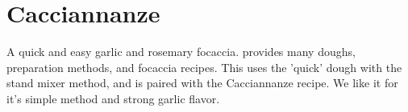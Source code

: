 \section{Cacciannanze}

\begin{recipestats}[
        servings=12,
        preptime=45~\minute,
        bakingtime=20~\minute,
        inactivetime=3~\hour,
        original=\citefield{caraccioloPizza}{shorttitle}~\cite{caraccioloPizza},
    ]
\end{recipestats}

\begin{recipeabstract}
    A quick and easy garlic and rosemary focaccia.
    \citeauthor{caraccioloPizza} provides many doughs, preparation methods, and focaccia recipes.
    This uses the 'quick' \cite[p.~83]{caraccioloPizza} dough with the stand mixer method,
    and is paired with the Cacciannanze \cite[p.~178]{caraccioloPizza} recipe.
    We like it for it's simple method and strong garlic flavor.
\end{recipeabstract}

\begin{ingredientcolumns}
    \begin{ingredientblock}[dough]
        \\
        \\
        \\
        \\
        \\
        \\
    \end{ingredientblock}
    \begin{ingredientblock}[topping]
        \\
        \\
        \\
        \\
    \end{ingredientblock}
\end{ingredientcolumns}

